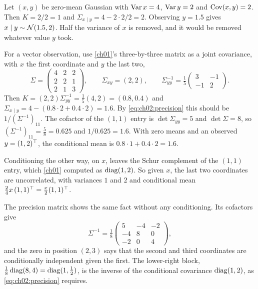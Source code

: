 \begin{example}\label{ex:ch02:cond}
Let $(x,y)$ be zero-mean Gaussian with $\operatorname{Var} x=4$, $\operatorname{Var} y=2$ and
$\operatorname{Cov}(x,y)=2$. Then $K=2/2=1$ and $\Sigma_{x\mid y}=4-2\cdot2/2=2$. Observing
$y=1.5$ gives $x\mid y\sim\mathcal{N}(1.5,2)$. Half the variance of $x$ is
removed, and it would be removed whatever value $y$ took.

For a vector observation, use \cref{ch01}'s three-by-three matrix as a joint
covariance, with $x$ the first coordinate and $y$ the last two,
\[
\Sigma=\begin{pmatrix}4&2&2\\2&2&1\\2&1&3\end{pmatrix},\qquad
\Sigma_{xy}=(2,2),\qquad
\Sigma_{yy}^{-1}=\tfrac15\begin{pmatrix}3&-1\\-1&2\end{pmatrix}.
\]
Then $K=(2,2)\Sigma_{yy}^{-1}=\tfrac15(4,2)=(0.8,0.4)$ and
$\Sigma_{x\mid y}=4-(0.8\cdot2+0.4\cdot2)=1.6$. By \cref{eq:ch02:precision}
this should be $1/(\Sigma^{-1})_{11}$. The cofactor of the $(1,1)$ entry is
$\det\Sigma_{yy}=5$ and $\det\Sigma=8$, so $(\Sigma^{-1})_{11}=\tfrac58=0.625$
and $1/0.625=1.6$. With zero means and an observed $y=(1,2)^{\top}$, the conditional
mean is $0.8\cdot1+0.4\cdot2=1.6$.

Conditioning the other way, on $x$, leaves the Schur complement of the
$(1,1)$ entry, which \cref{ch01} computed as $\operatorname{diag}(1,2)$. So given $x$, the
last two coordinates are uncorrelated, with variances $1$ and $2$ and
conditional mean $\tfrac24x\,(1,1)^{\top}=\tfrac{x}{2}(1,1)^{\top}$.

The precision matrix shows the same fact without any conditioning. Its
cofactors give
\[
\Sigma^{-1}=\tfrac18\begin{pmatrix}5&-4&-2\\-4&8&0\\-2&0&4\end{pmatrix},
\]
and the zero in position $(2,3)$ says that the second and third coordinates are
conditionally independent given the first. The lower-right block,
$\tfrac18\operatorname{diag}(8,4)=\operatorname{diag}(1,\tfrac12)$, is the inverse of the conditional
covariance $\operatorname{diag}(1,2)$, as \cref{eq:ch02:precision} requires.
\end{example}

